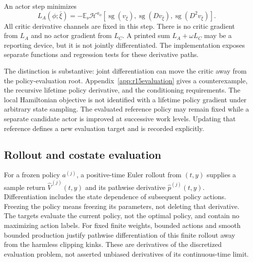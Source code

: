\documentclass[ecta,nameyear,draft]{econsocart}
\theoremstyle{definition}
\theoremstyle{remark}
\newcommand{\E}{\mathbb E}
\newcommand{\HH}{\mathcal H}
\newcommand{\sg}{\operatorname{sg}}
\begin{document}
An actor step minimizes
\begin{equation}\label{eq:actorloss}
 L_A(\phi;\bar\xi)=-\E_\nu\HH^{a_\phi}
 [\sg(v_{\bar\xi}),\sg(Dv_{\bar\xi}),\sg(D^2v_{\bar\xi})].
\end{equation}
All critic derivative channels are fixed in this step. There is no critic gradient from $L_A$ and no actor gradient from $L_C$. A printed sum $L_A+\omega L_C$ may be a reporting device, but it is not jointly differentiated. The implementation exposes separate functions and regression tests for these derivative paths.

The distinction is substantive: joint differentiation can move
the critic away from the policy-evaluation root. Appendix~\ref{app:r15evaluation}
gives a counterexample, the recursive lifetime policy derivative, and the
conditioning requirements. The local Hamiltonian objective is not identified
with a lifetime policy gradient under arbitrary state sampling.
The evaluated reference policy may remain fixed while a separate candidate
actor is improved at successive work levels. Updating that reference defines
a new evaluation target and is recorded explicitly.

\subsection{Rollout and costate evaluation}\label{sec:r11learning}
For a frozen policy $a^{(j)}$, a positive-time Euler rollout from $(t,y)$ supplies a sample return $\widehat V^{(j)}(t,y)$ and its pathwise derivative $\widehat p^{(j)}(t,y)$. Differentiation includes the state dependence of subsequent policy actions. Freezing the policy means freezing its parameters, not deleting that derivative. The targets evaluate the current policy, not the optimal policy, and contain no maximizing action labels. For fixed finite weights, bounded actions and smooth bounded production justify pathwise differentiation of this finite rollout away from the harmless clipping kinks. These are derivatives of the discretized evaluation problem, not asserted unbiased derivatives of its continuous-time limit.
\end{document}
